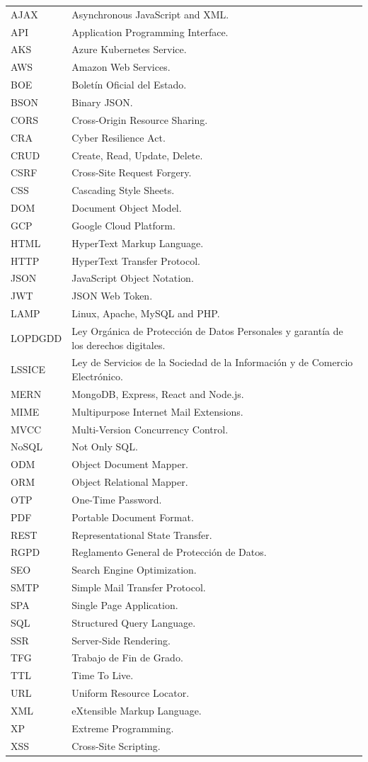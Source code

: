 \documentclass[12pt]{report} %
\begin{document}
\begin{longtable}{p{2.8cm}p{10.2cm}}
AJAX & Asynchronous JavaScript and XML. \\
API & Application Programming Interface. \\
AKS & Azure Kubernetes Service. \\
AWS & Amazon Web Services. \\
BOE & Boletín Oficial del Estado. \\
BSON & Binary JSON. \\
CORS & Cross-Origin Resource Sharing. \\
CRA & Cyber Resilience Act. \\
CRUD & Create, Read, Update, Delete. \\
CSRF & Cross-Site Request Forgery. \\
CSS & Cascading Style Sheets. \\
DOM & Document Object Model. \\
GCP & Google Cloud Platform. \\
HTML & HyperText Markup Language. \\
HTTP & HyperText Transfer Protocol. \\
JSON & JavaScript Object Notation. \\
JWT & JSON Web Token. \\
LAMP & Linux, Apache, MySQL and PHP. \\
LOPDGDD & Ley Orgánica de Protección de Datos Personales y garantía de los derechos digitales. \\
LSSICE & Ley de Servicios de la Sociedad de la Información y de Comercio Electrónico. \\
MERN & MongoDB, Express, React and Node.js. \\
MIME & Multipurpose Internet Mail Extensions. \\
MVCC & Multi-Version Concurrency Control. \\
NoSQL & Not Only SQL. \\
ODM & Object Document Mapper. \\
ORM & Object Relational Mapper. \\
OTP & One-Time Password. \\
PDF & Portable Document Format. \\
REST & Representational State Transfer. \\
RGPD & Reglamento General de Protección de Datos. \\
SEO & Search Engine Optimization. \\
SMTP & Simple Mail Transfer Protocol. \\
SPA & Single Page Application. \\
SQL & Structured Query Language. \\
SSR & Server-Side Rendering. \\
TFG & Trabajo de Fin de Grado. \\
TTL & Time To Live. \\
URL & Uniform Resource Locator. \\
XML & eXtensible Markup Language. \\
XP & Extreme Programming. \\
XSS & Cross-Site Scripting. \\
\end{longtable}
\end{document}
